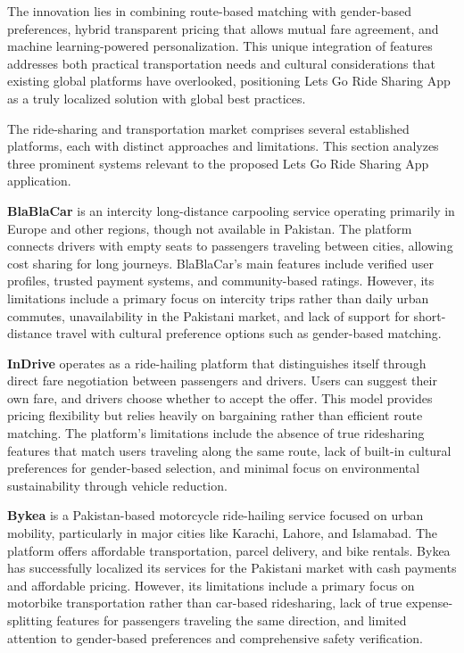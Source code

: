 The innovation lies in combining route-based matching with gender-based preferences, hybrid transparent pricing that allows mutual fare agreement, and machine learning-powered personalization. This unique integration of features addresses both practical transportation needs and cultural considerations that existing global platforms have overlooked, positioning Lets Go Ride Sharing App as a truly localized solution with global best practices.


The ride-sharing and transportation market comprises several established platforms, each with distinct approaches and limitations. This section analyzes three prominent systems relevant to the proposed Lets Go Ride Sharing App application.

\textbf{BlaBlaCar} is an intercity long-distance carpooling service operating primarily in Europe and other regions, though not available in Pakistan. The platform connects drivers with empty seats to passengers traveling between cities, allowing cost sharing for long journeys. BlaBlaCar's main features include verified user profiles, trusted payment systems, and community-based ratings. However, its limitations include a primary focus on intercity trips rather than daily urban commutes, unavailability in the Pakistani market, and lack of support for short-distance travel with cultural preference options such as gender-based matching.

\textbf{InDrive} operates as a ride-hailing platform that distinguishes itself through direct fare negotiation between passengers and drivers. Users can suggest their own fare, and drivers choose whether to accept the offer. This model provides pricing flexibility but relies heavily on bargaining rather than efficient route matching. The platform's limitations include the absence of true ridesharing features that match users traveling along the same route, lack of built-in cultural preferences for gender-based selection, and minimal focus on environmental sustainability through vehicle reduction.

\textbf{Bykea} is a Pakistan-based motorcycle ride-hailing service focused on urban mobility, particularly in major cities like Karachi, Lahore, and Islamabad. The platform offers affordable transportation, parcel delivery, and bike rentals. Bykea has successfully localized its services for the Pakistani market with cash payments and affordable pricing. However, its limitations include a primary focus on motorbike transportation rather than car-based ridesharing, lack of true expense-splitting features for passengers traveling the same direction, and limited attention to gender-based preferences and comprehensive safety verification.

